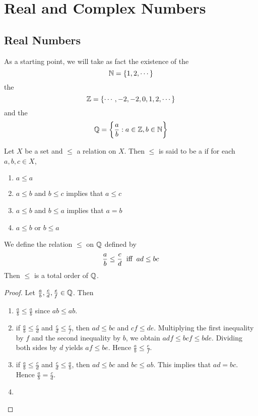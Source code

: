 \documentclass{book}
\begin{document}
	
	\chapter{Real and Complex Numbers}
	
	\section{Real Numbers}
	\begin{note}
		As a starting point, we will take as fact the existence of the  $$\mathbb{N} = \{1, 2, \cdots\}$$ the  $$\mathbb{Z} = \{\cdots, -2, -2, 0, 1, 2, \cdots\}$$ and the  $$\mathbb{Q} = \bigg \{\frac{a}{b}: a \in \mathbb{Z}, b \in \mathbb{N} \bigg \}$$
	\end{note}
	
	\begin{defn} \ld{}
		Let $X$ be a set and $\leq$ a relation on $X$. Then $\leq$ is said to be a  if for each $a,b,c \in X$,
		\begin{enumerate}
			\item $a \leq a$
			\item $a \leq b$ and $b \leq c$ implies that $a \leq  c$ 
			\item $a \leq b$ and $b \leq a$ implies that $a = b$ 
			\item $a \leq b$ or $b \leq a$
		\end{enumerate}
	\end{defn}

	\begin{ex} \lex{}
		We define the relation $\leq$ on $\mathbb{Q}$ defined by $$\frac{a}{b} \leq \frac{c}{d} \hspace{.2cm} \text{iff} \hspace{.2cm} ad \leq bc$$ Then $\leq$ is a total order of $\mathbb{Q}$.
	\end{ex}

	\begin{proof} Let $\frac{a}{b}, \frac{c}{d}, \frac{e}{f} \in \mathbb{Q}$. Then
		\begin{enumerate}
			\item  $\frac{a}{b} \leq \frac{a}{b}$ since $ab \leq ab$. 
			\item if $\frac{a}{b} \leq \frac{c}{d}$ and $\frac{c}{d} \leq  \frac{e}{f}$, then $ad \leq bc$ and $ cf \leq de$. Multiplying the first inequality by $f$ and the second inequality by $b$, we obtain $adf \leq bcf \leq bde$. Dividing both sides by $d$ yields $af \leq be$. Hence $\frac{a}{b} \leq \frac{e}{f}$. 
			\item if $\frac{a}{b} \leq \frac{c}{d}$ and $\frac{c}{d} \leq \frac{a}{b}$, then $ad \leq bc$ and $bc \leq ab$. This implies that $ad = bc$. Hence $\frac{a}{b} = \frac{c}{d}$.
			\item 
		\end{enumerate}
	\end{proof}
	
\end{document}
